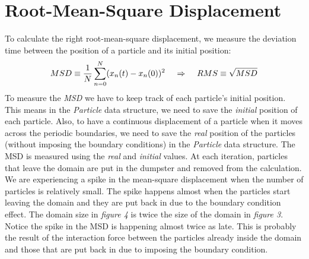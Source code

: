 \documentclass[a4paper,11pt]{article}
\newcommand\tab[1][4mm]{\hspace*{#1}}
\begin{document}
\section*{Root-Mean-Square Displacement}
To calculate the right root-mean-square displacement, we measure the deviation time between the position of a particle and its initial position:
\begin{align*}
  MSD \equiv \frac{1}{N}\sum_{n=0}^{N}(x_n(t) - x_n(0))^2 \tab \Rightarrow \tab RMS \equiv \sqrt{MSD}
\end{align*}
To measure the \emph{MSD} we have to keep track of each particle's initial position. This means in the \emph{Particle} data structure, we need to save the \emph{initial} position of each particle. Also, to have a continuous displacement of a particle when it moves across the periodic boundaries, we need to save the \emph{real} position of the particles (without imposing the boundary conditions) in the \emph{Particle} data structure. The MSD is measured using the \emph{real} and \emph{initial} values. At each iteration, particles that leave the domain are put in the dumpster and removed from the calculation. \\
We are experiencing a spike in the mean-square displacement when the number of particles is relatively small. The spike happens almost when the particles start leaving the domain and they are put back in due to the boundary condition effect. The domain size in \emph{figure 4} is twice the size of the domain in \emph{figure 3}. Notice the spike in the MSD is happening almost twice as late. This is probably the result of the interaction force between the particles already inside the domain and those that are put back in due to imposing the boundary condition.
\end{document}
